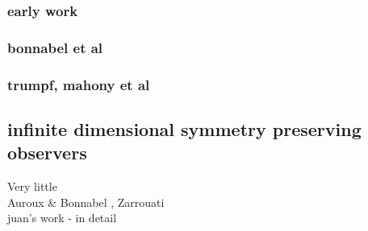 \subsubsection{early work}
\subsubsection{bonnabel et al}
\subsubsection{trumpf, mahony et al}

\subsection{infinite dimensional symmetry preserving observers}
Very little\\
Auroux \& Bonnabel \cite{auroux2011symmetry}, Zarrouati \cite{zarrouati2013augmented} \\
juan's work \cite{adarvefiltering} - in detail

